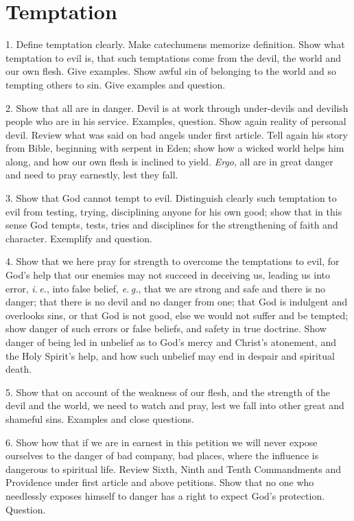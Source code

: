 \section{Temptation}

1. Define temptation clearly. Make catechumens memorize definition. Show what temptation to evil is, that such temptations come from the devil, the world and our own flesh. Give examples. Show awful sin of belonging to the world and so tempting others to sin. Give examples and question. 

2. Show that all are in danger. Devil is at work through under-devils and devilish people who are in his service. Examples, question. Show again reality of personal devil. Review what was said on bad angels under first article. Tell again his story from Bible, beginning with serpent in Eden; show how a wicked world helps him along, and how our own flesh is inclined to yield. \emph{Ergo}, all are in great danger and need to pray earnestly, lest they fall. 

3. Show that God cannot tempt to evil. Distinguish clearly such temptation to evil from testing, trying, disciplining anyone for his own good; show that in this sense God tempts, tests, tries and disciplines for the strengthening of faith and character. Exemplify and question. 

4. Show that we here pray for strength to overcome the temptations to evil, for God’s help that our enemies may not succeed in deceiving us, leading us into error, \emph{i.\,e.}, into false belief, \emph{e.\,g.}, that we are strong and safe and there is no danger; that there is no devil and no danger from one; that God is indulgent and overlooks sins, or that God is not good, else we would not suffer and be tempted; show danger of such errors or false beliefs, and safety in true doctrine. Show danger of being led in unbelief as to God’s mercy and Christ’s atonement, and the Holy Spirit’s help, and how such unbelief may end in despair and spiritual death. 

5. Show that on account of the weakness of our flesh, and the strength of the devil and the world, we need to watch and pray, lest we fall into other great and shameful sins. Examples and close questions. 

6. Show how that if we are in earnest in this petition we will never expose ourselves to the danger of bad company, bad places, where the influence is dangerous to spiritual life. Review Sixth, Ninth and Tenth Commandments and Providence under first article and above petitions. Show that no one who needlessly exposes himself to danger has a right to expect God’s protection. Question.

